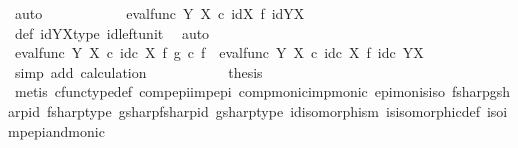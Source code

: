 \begin{isabellebody}
\ auto\isanewline
\ \ \ \ \ \ \isamarkupfalse%
\ \isamarkupfalse%
\ {\isachardoublequoteopen}{\isachardot}{\kern0pt}{\isachardot}{\kern0pt}{\isachardot}{\kern0pt}\ {\isacharequal}{\kern0pt}\ eval{\isacharunderscore}{\kern0pt}func\ Y\ X\ {\isasymcirc}\isactrlsub c\ id{\isacharparenleft}{\kern0pt}X{\isacharparenright}{\kern0pt}\ {\isasymtimes}\isactrlsub f\ id{\isacharparenleft}{\kern0pt}Y\isactrlbsup X\isactrlesup {\isacharparenright}{\kern0pt}{\isachardoublequoteclose}\isanewline
\ \ \ \ \ \ \ \ \isamarkupfalse%
\ {\isasympsi}{\isacharunderscore}{\kern0pt}def\ idYX{\isacharunderscore}{\kern0pt}type\ id{\isacharunderscore}{\kern0pt}left{\isacharunderscore}{\kern0pt}unit{}\ \isamarkupfalse%
\ auto\isanewline
\ \ \ \ \ \ \isamarkupfalse%
\ \isamarkupfalse%
\ {\isachardoublequoteopen}eval{\isacharunderscore}{\kern0pt}func\ Y\ X\ {\isasymcirc}\isactrlsub c\ id\isactrlsub c\ X\ {\isasymtimes}\isactrlsub f\ g\isactrlsup {\isasymsharp}\ {\isasymcirc}\isactrlsub c\ f\isactrlsup {\isasymsharp}\ {\isacharequal}{\kern0pt}\ eval{\isacharunderscore}{\kern0pt}func\ Y\ X\ {\isasymcirc}\isactrlsub c\ id\isactrlsub c\ X\ {\isasymtimes}\isactrlsub f\ id\isactrlsub c\ {\isacharparenleft}{\kern0pt}Y\isactrlbsup X\isactrlesup {\isacharparenright}{\kern0pt}{\isachardoublequoteclose}\isanewline
\ \ \ \ \ \ \ \ \isamarkupfalse%
\ {\isacharparenleft}{\kern0pt}simp\ add{\isacharcolon}{\kern0pt}\ calculation{\isacharparenright}{\kern0pt}\isanewline
\ \ \ \ \isamarkupfalse%
\isanewline
\ \ \isamarkupfalse%
\isanewline
\ \ \isamarkupfalse%
\ {\isacharquery}{\kern0pt}thesis\isanewline
\ \ \ \ \isamarkupfalse%
\ {\isacharparenleft}{\kern0pt}metis\ cfunc{\isacharunderscore}{\kern0pt}type{\isacharunderscore}{\kern0pt}def\ comp{\isacharunderscore}{\kern0pt}epi{\isacharunderscore}{\kern0pt}imp{\isacharunderscore}{\kern0pt}epi\ comp{\isacharunderscore}{\kern0pt}monic{\isacharunderscore}{\kern0pt}imp{\isacharunderscore}{\kern0pt}monic\ epi{\isacharunderscore}{\kern0pt}mon{\isacharunderscore}{\kern0pt}is{\isacharunderscore}{\kern0pt}iso\ fsharp{\isacharunderscore}{\kern0pt}gsharp{\isacharunderscore}{\kern0pt}id\ fsharp{\isacharunderscore}{\kern0pt}type\ gsharp{\isacharunderscore}{\kern0pt}fsharp{\isacharunderscore}{\kern0pt}id\ gsharp{\isacharunderscore}{\kern0pt}type\ id{\isacharunderscore}{\kern0pt}isomorphism\ is{\isacharunderscore}{\kern0pt}isomorphic{\isacharunderscore}{\kern0pt}def\ iso{\isacharunderscore}{\kern0pt}imp{\isacharunderscore}{\kern0pt}epi{\isacharunderscore}{\kern0pt}and{\isacharunderscore}{\kern0pt}monic{\isacharparenright}{\kern0pt}\isanewline

\end{isabellebody}
